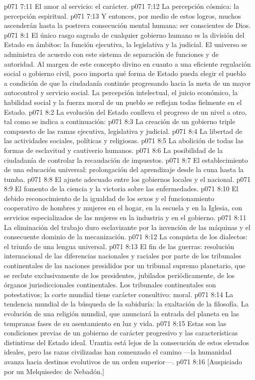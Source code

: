 \vs p071 7:11 El amor al servicio: el carácter.
\vs p071 7:12 La percepción cósmica: la percepción espiritual.
\vs p071 7:13 \pc Y entonces, por medio de estos logros, muchos ascenderán hasta la postrera consecución mental humana: ser conscientes de Dios.
\vs p071 8:1 El único rasgo sagrado de cualquier gobierno humano es la división del Estado en ámbitos: la función ejecutiva, la legislativa y la judicial. El universo se administra de acuerdo con este sistema de separación de funciones y de autoridad. Al margen de este concepto divino en cuanto a una eficiente regulación social o gobierno civil, poco importa qué forma de Estado pueda elegir el pueblo a condición de que la ciudadanía continúe progresando hacia la meta de un mayor autocontrol y servicio social. La percepción intelectual, el juicio económico, la habilidad social y la fuerza moral de un pueblo se reflejan todas fielmente en el Estado.
\vs p071 8:2 La evolución del Estado conlleva el progreso de un nivel a otro, tal como se indica a continuación:
\vs p071 8:3 La creación de un gobierno triple compuesto de las ramas ejecutiva, legislativa y judicial.
\vs p071 8:4 La libertad de las actividades sociales, políticas y religiosas.
\vs p071 8:5 La abolición de todas las formas de esclavitud y cautiverio humanos.
\vs p071 8:6 La posibilidad de la ciudadanía de controlar la recaudación de impuestos.
\vs p071 8:7 El establecimiento de una educación universal: prolongación del aprendizaje desde la cuna hasta la tumba.
\vs p071 8:8 El ajuste adecuado entre los gobiernos locales y el nacional.
\vs p071 8:9 El fomento de la ciencia y la victoria sobre las enfermedades.
\vs p071 8:10 El debido reconocimiento de la igualdad de los sexos y el funcionamiento cooperativo de hombres y mujeres en el hogar, en la escuela y en la Iglesia, con servicios especializados de las mujeres en la industria y en el gobierno.
\vs p071 8:11 La eliminación del trabajo duro esclavizante por la invención de las máquinas y el consecuente dominio de la mecanización.
\vs p071 8:12 La conquista de los dialectos: el triunfo de una lengua universal.
\vs p071 8:13 El fin de las guerras: resolución internacional de las diferencias nacionales y raciales por parte de los tribunales continentales de las naciones presididos por un tribunal supremo planetario, que se reclute exclusivamente de los presidentes, jubilados periódicamente, de los órganos jurisdiccionales continentales. Los tribunales continentales son potestativos; la corte mundial tiene carácter consultivo: moral.
\vs p071 8:14 La tendencia mundial de la búsqueda de la sabiduría: la exaltación de la filosofía. La evolución de una religión mundial, que anunciará la entrada del planeta en las tempranas fases de su asentamiento en luz y vida.
\vs p071 8:15 \pc Estas son las condiciones previas de un gobierno de carácter progresivo y las características distintivas del Estado ideal. Urantia está lejos de la consecución de estos elevados ideales, pero las razas civilizadas han comenzado el camino ---la humanidad avanza hacia destinos evolutivos de un orden superior---.
\vsetoff
\vs p071 8:16 [Auspiciado por un Melquisedec de Nebadón.]
